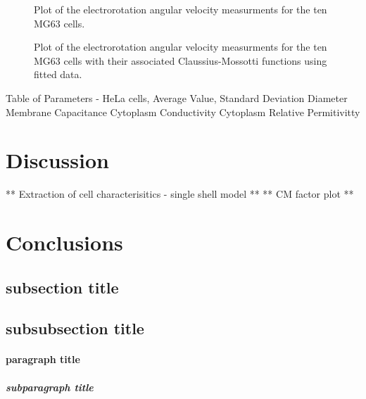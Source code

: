 \begin{figure}
	\centering
	\caption{Plot of the electrorotation angular velocity measurments for the ten MG63 cells.}
	\label{fig:MG63_ROT_scatter plot}
\end{figure}

\begin{figure}
	\centering
	\caption{Plot of the electrorotation angular velocity measurments for the ten MG63 cells with their associated Claussius-Mossotti functions using fitted data.}
	\label{fig:MG63_ROT_fits}
\end{figure}

Table of Parameters - HeLa cells, Average Value, Standard Deviation
Diameter
Membrane Capacitance
Cytoplasm Conductivity
Cytoplasm Relative Permitivitty

\section{Discussion}

** Extraction of cell characterisitics - single shell model **
** CM factor plot **

\section{Conclusions}

\clearpage

\subsection{subsection title}
\subsection{subsubsection title}
\paragraph{paragraph title}
\subparagraph{subparagraph title}
